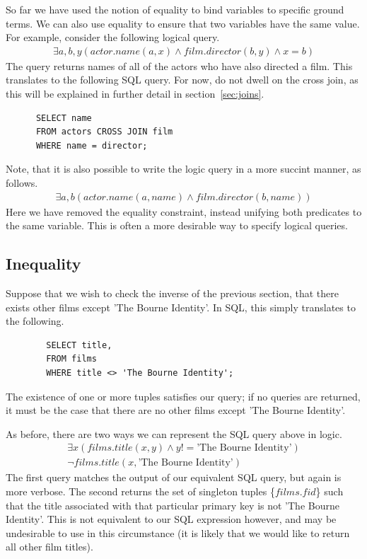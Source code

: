 \documentclass[a4paper, 11pt]{article}
\begin{document}
      So far we have used the notion of equality to bind variables to specific
      ground terms. We can also use equality to ensure that two variables have
      the same value. For example, consider the following logical query.
      \begin{gather}
        \exists a,b,y(actor.name(a, x) \land film.director(b, y) \land x = b)
      \end{gather}
      The query returns names of all of the actors who have also directed a
      film. This translates to the following SQL query. For now, do not dwell
      on the cross join, as this will be explained in further detail in
      section~\ref{sec:joins}.

      \begin{verbatim}
      SELECT name
      FROM actors CROSS JOIN film
      WHERE name = director;
      \end{verbatim}

      Note, that it is also possible to write the logic query in a more succint
      manner, as follows.
      \begin{gather}
        \exists a,b(actor.name(a, name) \land film.director(b, name))
      \end{gather}
      Here we have removed the equality constraint, instead unifying both
      predicates to the same variable. This is often a more desirable way to
      specify logical queries.

    \subsection{Inequality}

      Suppose that we wish to check the inverse of the previous section, that
      there exists other films except 'The Bourne Identity'. In SQL, this
      simply translates to the following.

      \begin{verbatim}
        SELECT title,
        FROM films
        WHERE title <> 'The Bourne Identity';
      \end{verbatim}

      The existence of one or more tuples satisfies our query; if no queries
      are returned, it must be the case that there are no other films except
      'The Bourne Identity'.

      As before, there are two ways we can represent the SQL query above in
      logic.
      \begin{gather}
        \exists x(films.title(x, y) \land y !=  \text{'The Bourne
        Identity'})\label{where3}\\
        \lnot films.title(x, \text{'The Bourne Identity'})\label{where4}
      \end{gather}
      The first query matches the output of our equivalent SQL query, but again
      is more verbose. The second returns the set of singleton tuples
      \{$films.fid$\} such that the title associated with that particular
      primary key is not 'The Bourne Identity'. This is not equivalent to our
      SQL expression however, and may be undesirable to use in this
      circumstance (it is likely that we would like to return all other film
      titles).
\end{document}
